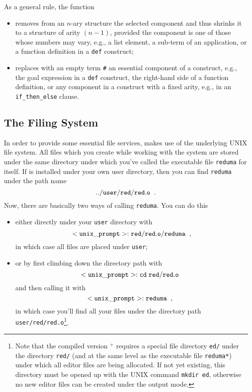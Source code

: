 As a general rule, the { function}
\begin{itemize}
\item removes from an $n$-ary structure the selected component and
thus shrinks it to a structure of arity $(n-1)$, provided the component
is one of those whose numbers may vary, e.g., a list element,
a sub-term of an application,
 or a function definition in a {\tt def} construct;
\item replaces with an empty term {\tt \#}
 an essential component of a construct, e.g., the
goal expression in a {\tt def} construct, the right-hand side of a
function definition, or any component in a construct with a
fixed arity, e.g., in an {\tt if\_then\_else} clause. 
\end{itemize}

\subsection{The Filing System}

In order to provide some essential {\mys file services}, \pired makes use of
the underlying UNIX file system. All files which you create while
working with the system are stored under the same directory
under which you've  called the {\mys executable file} {\tt reduma} for
\pired itself. If \pired is installed under your own user
directory,  then you can find {\tt reduma} under the path name
$$
{\tt ../user/red/red.o}\;\;.
$$
Now, there are basically two ways of {\mys calling} {\tt reduma}. You can do this
\begin{itemize}
\item either directly under your {\tt user} directory with
$$
{\tt <unix\_prompt> : red/red.o/reduma}\;\;,
$$
in which case all files are placed under {\tt user};
\item or by first climbing down the directory path with
$$
{\tt <unix\_prompt> : cd\; red/red.o}\;\; 
$$
and then calling it with
$$
{\tt <unix\_prompt> : reduma}\;\;,\;\;
$$
in which case you'll find all your files under the directory
path {\tt user/red/red.o}\footnote{Note that the compiled version
 \pired$^+$ requires a special file directory {\tt ed/} under the 
directory {\tt red/} (and at the same level as the executable file
 {\tt reduma*}) under which all editor files are being allocated.
 If not yet existing, this directory must be opened up with
the UNIX command {\tt mkdir ed}, otherwise no new editor files can be created under the output mode.}.
\end{itemize}

